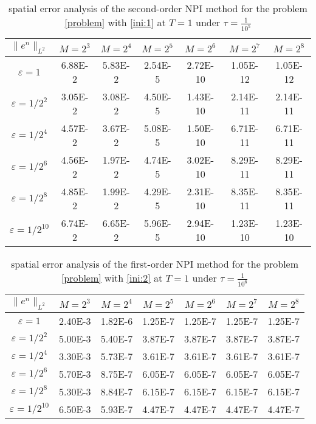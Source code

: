 \documentclass[final,leqno,showlabe]{siamltex}
\begin{document}
\begin{table}[tbhp]
{\footnotesize
  \caption{spatial error analysis of the second-order NPI method for the problem \eqref{problem} with \eqref{ini:1} at $T=1$ under $\tau=\frac{1}{10^5}$}\label{tab:spatialtwo}
\begin{center}
\begin{tabular}{|c|c|c|c|c|c|c|}
     \hline
     $\|e^n\|_{L^2}$ &$M=2^3$ &$M=2^4$ &$M=2^5$& $M=2^6$&$M=2^7$&$M=2^8$\\
     \hline
    $\varepsilon=1$&      6.88E-2 &  5.83E-2   & 2.54E-5 &  2.72E-10 &  1.05E-12& 1.05E-12\\
     $\varepsilon=1/2^2$& 3.05E-2 & 3.08E-2  & 4.50E-5  & 1.43E-10  & 2.14E-11  & 2.14E-11  \\
     $\varepsilon=1/2^4$& 4.57E-2 & 3.67E-2  & 5.08E-5  & 1.50E-10  & 6.71E-11 & 6.71E-11\\
     $\varepsilon=1/2^6$& 4.56E-2& 1.97E-2 & 4.74E-5   & 3.02E-10  & 8.29E-11 & 8.29E-11   \\
     $\varepsilon=1/2^8$& 4.85E-2& 1.99E-2 & 4.29E-5 & 2.31E-10 & 8.35E-11 & 8.35E-11   \\
     $\varepsilon=1/2^{10}$& 6.74E-2& 6.65E-2 & 5.96E-5 & 2.94E-10 & 1.23E-10 & 1.23E-10   \\
     \hline
\end{tabular}
\end{center}
}
\end{table}

\begin{table}[tbhp]
{\footnotesize
  \caption{spatial error analysis of the first-order NPI method for the problem \eqref{problem} with \eqref{ini:2} at $T=1$ under $\tau=\frac{1}{10^6}$}\label{tab:spatialthree}
\begin{center}
\begin{tabular}{|c|c|c|c|c|c|c|}
     \hline
     $\|e^n\|_{L^2}$ &$M=2^3$ &$M=2^4$ &$M=2^5$& $M=2^6$&$M=2^7$&$M=2^8$\\
     \hline
    $\varepsilon=1$&      2.40E-3 &  1.82E-6   & 1.25E-7 &  1.25E-7 &  1.25E-7& 1.25E-7\\
     $\varepsilon=1/2^2$& 5.00E-3 & 5.40E-7  & 3.87E-7  & 3.87E-7  & 3.87E-7  & 3.87E-7  \\
     $\varepsilon=1/2^4$& 3.30E-3 & 5.73E-7  & 3.61E-7  & 3.61E-7  & 3.61E-7 & 3.61E-7\\
     $\varepsilon=1/2^6$& 5.70E-3& 8.75E-7 & 6.05E-7   & 6.05E-7  & 6.05E-7 & 6.05E-7   \\
     $\varepsilon=1/2^8$& 5.30E-3& 8.84E-7 & 6.15E-7 & 6.15E-7 & 6.15E-7 & 6.15E-7   \\
     $\varepsilon=1/2^{10}$& 6.50E-3& 5.93E-7 & 4.47E-7 & 4.47E-7 & 4.47E-7 & 4.47E-7   \\
     \hline
\end{tabular}
\end{center}
}
\end{table}
\end{document}

